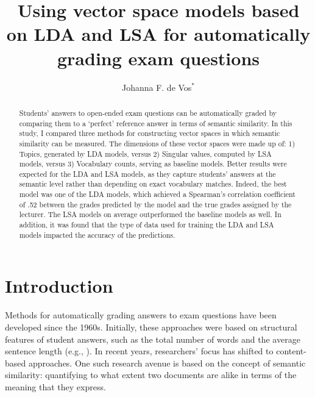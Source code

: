 \documentclass[a4paper,10pt,twoside]{article}
\begin{document}
\title{Using vector space models based on LDA and LSA for automatically grading exam questions}

\author{Johanna F. de Vos$^*$ 
\AND {}}


\maketitle\thispagestyle{empty} %


\begin{abstract}
Students' answers to open-ended exam questions can be automatically graded by comparing them to a `perfect' reference answer in terms of semantic similarity. In this study, I compared three methods for constructing vector spaces in which semantic similarity can be measured. The dimensions of these vector spaces were made up of: 1) Topics, generated by LDA models, versus 2) Singular values, computed by LSA models, versus 3) Vocabulary counts, serving as baseline models. Better results were expected for the LDA and LSA models, as they capture students' answers at the semantic level rather than depending on exact vocabulary matches. Indeed, the best model was one of the LDA models, which achieved a Spearman's correlation coefficient of .52 between the grades predicted by the model and the true grades assigned by the lecturer. The LSA models on average outperformed the baseline models as well. In addition, it was found that the type of data used for training the LDA and LSA models impacted the accuracy of the predictions.
\end{abstract}

\section{Introduction}

Methods for automatically grading answers to exam questions have been developed since the 1960s. Initially, these approaches were based on structural features of student answers, such as the total number of words and the average sentence length (e.g., ). In recent years, researchers' focus has shifted to content-based approaches. One such research avenue is based on the concept of semantic similarity: quantifying to what extent two documents are alike in terms of the meaning that they express.
\end{document}
